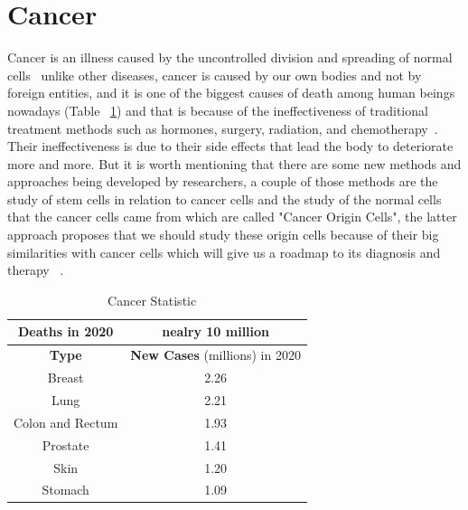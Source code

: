 \section{Cancer}
        Cancer is an illness caused by the uncontrolled division and spreading of normal cells~\cite{whatiscancer2021} unlike other diseases, cancer is caused by our own bodies and not by foreign entities, and it is one of the biggest causes of death among human beings nowadays (Table ~\ref{tab:cancerStat}) and that is because of the ineffectiveness of traditional treatment methods such as hormones, surgery, radiation, and chemotherapy~\cite{mahsa2022}. Their ineffectiveness is due to their side effects that lead the body to deteriorate more and more. But it is worth mentioning that there are some new methods and approaches being developed by researchers, a couple of those methods are the study of stem cells in relation to cancer cells and the study of the normal cells that the cancer cells came from which are called "Cancer Origin Cells", the latter approach proposes that we should study these origin cells because of their big similarities with cancer cells which will give us a roadmap to its diagnosis and therapy~\cite{rachita2021} .
\begin{table}[htbp]
\begin{center}
\begin{tabular}{|c||c|}
Deaths in 2020 & nealry 10 million \\
\hline
\textbf{Type} & \textbf{New Cases} (millions) in 2020 \\
\hline
Breast &  2.26\\
\hline
Lung &  2.21\\
\hline
Colon and Rectum & 1.93 \\
\hline
Prostate & 1.41 \\
\hline
Skin &  1.20 \\
\hline
Stomach & 1.09 \\
\end{tabular}
\end{center}
\caption{Cancer Statistic ~\cite{cancerStat}}
\label{tab:cancerStat}
\end{table}

